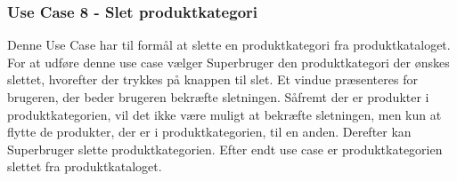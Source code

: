 \subsubsection{Use Case 8 - Slet produktkategori}
Denne Use Case har til formål at slette en produktkategori fra produktkataloget. For at udføre denne use case vælger Superbruger den produktkategori der ønskes slettet, hvorefter der trykkes på knappen til slet. Et vindue præsenteres for brugeren, der beder brugeren bekræfte sletningen. Såfremt der er produkter i produktkategorien, vil det ikke være muligt at bekræfte sletningen, men kun at flytte de produkter, der er i produktkategorien, til en anden. Derefter kan Superbruger slette produktkategorien. Efter endt use case er produktkategorien slettet fra produktkataloget.
